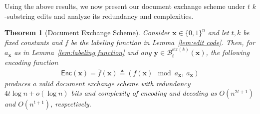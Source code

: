 \documentclass[onecolumn]{IEEEtran}
\newtheorem{theorem}{Theorem}
\newcommand{\bl}{n}
\newcommand{\numedits}{t}
\newcommand{\editsize}{k}
\newcommand{\editball}[3]{\mathcal{B}_{#1}^{#2}(#3)}
\newcommand{\encode}{\mathsf{Enc}}
\newcommand{\tksub}{$\numedits$ $\editsize$-substring\xspace}
\newcommand{\defeq}{\ensuremath{\triangleq}}
\newcommand{\bfy}{{\mathbf{ y}}}
\begin{document}
Using the above results, we now present our document exchange scheme under \tksub edits and analyze its redundancy and complexities.
\begin{theorem}[Document Exchange Scheme]
\label{thm: Dx}
    Consider $\mathbf{x} \in \{0,1\}^\bl$ and let $\numedits, \editsize$ be fixed constants and $f$ be the labeling function in Lemma~\ref{lem:edit code}. Then, for $a_\mathbf{x}$ as in Lemma~\ref{lem:labeling function} and any $\bfy\in\editball{\numedits}{\mathrm{str}(\editsize)}{\mathbf{x}}$, the following encoding function
    \begin{align*}
        \encode(\mathbf{x}) = \bar{f}(\mathbf{x}) \defeq (f(\mathbf{x})\mod {a_\mathbf{x}},~a_\mathbf{x})
    \end{align*}
    produces a valid document exchange scheme with redundancy $4\numedits\log\bl + o(\log\bl)$ bits and complexity of encoding and decoding as $O(\bl^{2\numedits+1})$ and $O(\bl^{\numedits+1})$, respectively.  
\end{theorem}
\end{document}
